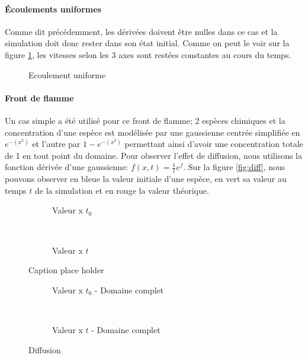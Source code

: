 \paragraph{Écoulements uniformes}
Comme dit précédemment, les dérivées doivent être nulles dans ce cas et la simulation doit donc rester dans son état initial. Comme on peut le voir sur la figure \ref{fig:uniform_flow}, les vitesses selon les 3 axes sont restées constantes au cours du temps.
 
\begin{figure}[ht]
  \centering
  \caption{\label{fig:uniform_flow}Ecoulement uniforme}
\end{figure}

\paragraph{Front de flamme}
Un cas simple a été utilisé pour ce front de flamme; 2 espèces chimiques et la concentration d'une espèce est modélisée par une gaussienne centrée simplifiée en $e^{-(x^2)}$ et l'autre par $1-e^{-(x^2)}$ permettant ainsi d'avoir une concentration totale de 1 en tout point du domaine. Pour observer l'effet de diffusion, nous utilisons la fonction dérivée d'une gaussienne: $f(x,t)=\frac{1}{t}e^{f}$. Sur la figure \ref{fig:diff}, nous pouvons observer en bleue la valeur initiale d'une espèce, en vert sa valeur au temps $t$ de la simulation et en rouge la valeur théorique.


\begin{figure}[t!]
  \centering
  \begin{subfigure}[b]{0.5\textwidth}
    \centering
    \caption{\label{fig:diff_0}Valeur x $t_0$}
  \end{subfigure}%
  ~ 
  \begin{subfigure}[b]{0.5\textwidth}
    \centering
    \caption{\label{fig:diff_325}Valeur x $t$}
  \end{subfigure}
  \caption{Caption place holder}
  \centering
  \begin{subfigure}[b]{0.5\textwidth}
    \centering
    \caption{\label{fig:diff_0_domain}Valeur x $t_0$ - Domaine complet}
  \end{subfigure}%
  ~ 
  \begin{subfigure}[b]{0.5\textwidth}
    \centering
    \caption{\label{fig:diff_325_domain}Valeur x $t$ - Domaine complet}
  \end{subfigure}
  \caption{\label{fig:diff_}Diffusion}
\end{figure}



